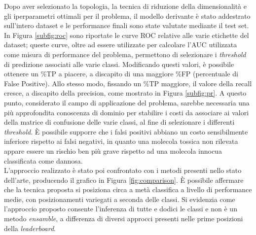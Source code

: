 Dopo aver selezionato la topologia, la tecnica di riduzione della dimensionalità e gli iperparametri ottimali per il problema, il modello derivante è stato addestrato sull'intero dataset e le performance finali sono state valutate mediante il test set.
In Figura \ref{subfig:roc} sono riportate le curve ROC relative alle varie etichette del dataset; queste curve, oltre ad essere utilizzate per calcolare l'AUC utilizzata come misura di performance del problema, permettono di selezionare i \textit{threshold} di predizione associati alle varie classi. 
Modificando questi valori, è possibile ottenere un \%TP a piacere, a discapito di una maggiore \%FP (percentuale di False Positive). 
Allo stesso modo, fissando un \%TP maggiore, il valore della recall cresce, a discapito della precision, come mostrato in Figura \ref{subfig:pr}. 
A questo punto, considerato il campo di applicazione del problema, sarebbe necessaria una più approfondita conoscenza di dominio per stabilire i costi da associare ai valori della matrice di confusione delle varie classi, al fine di selezionare i differenti \textit{threshold}. 
È possibile supporre che i falsi positivi abbiano un costo sensibilmente inferiore rispetto ai falsi negativi, in quanto una molecola tossica non rilevata appare essere un rischio ben più grave rispetto ad una molecola innocua classificata come dannosa.\\
L'approccio realizzato è stato poi confrontato con i metodi presenti nello stato dell'arte, producendo il grafico in Figura \ref{fig:comparison}. È possibile affermare che la tecnica proposta si posiziona circa a metà classifica a livello di performance medie, con posizionamenti variegati a seconda delle classi. Si evidenzia come l'approccio proposto consente l'inferenza di tutte e dodici le classi e non è un metodo \textit{ensamble}, a differenza di diversi approcci presenti nelle prime posizioni della \textit{leaderboard}.


